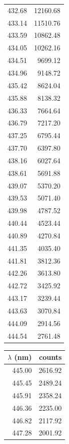 \begin{table}[!h]
\begin{tabular}{rr}
          432.68 &  12160.68 \\
          433.14 &  11510.76 \\
          433.59 &  10862.48 \\
          434.05 &  10262.16 \\
          434.51 &   9699.12 \\
          434.96 &   9148.72 \\
          435.42 &   8624.04 \\
          435.88 &   8138.32 \\
          436.33 &   7664.64 \\
          436.79 &   7217.20 \\ 
          437.25 &   6795.44 \\
          437.70 &   6397.80 \\
          438.16 &   6027.64 \\
          438.61 &   5691.88 \\
          439.07 &   5370.20 \\
          439.53 &   5071.40 \\
          439.98 &   4787.52 \\
          440.44 &   4523.44 \\
          440.89 &   4270.84 \\
          441.35 &   4035.40 \\
          441.81 &   3812.36 \\
          442.26 &   3613.80 \\
          442.72 &   3425.92 \\
          443.17 &   3239.44 \\
          443.63 &   3070.84 \\
          444.09 &   2914.56 \\
          444.54 &   2761.48 \\
\bottomrule
\end{tabular}        
\begin{tabular}{rr}
\toprule
 $\lambda$ (nm) &    counts \\
\midrule
          445.00 &   2616.92 \\
          445.45 &   2489.24 \\
          445.91 &   2358.24 \\
          446.36 &   2235.00 \\
          446.82 &   2117.92 \\
          447.28 &   2001.92 \\

\end{tabular}
\end{table}
